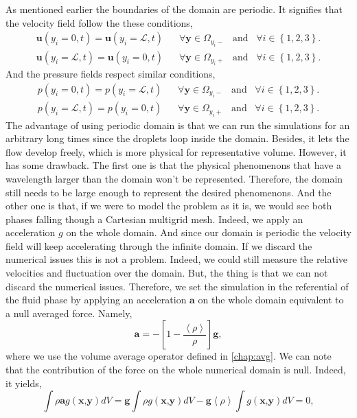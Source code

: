 As mentioned earlier  the boundaries of the domain are periodic. 
It signifies that the velocity field follow the these conditions,
\begin{align}
    \bm{u}(y_i = 0,t) = \bm{u}(y_i = \mathcal{L},t) \;\;\; &\forall \bm{y} \in \Omega_{y_i-} \;\;\;\text{and}\;\;\; \forall i \in \left\{1,2,3\right\}.\\
    \bm{u}(y_i = \mathcal{L},t) = \bm{u}(y_i = 0,t) \;\;\; & \forall \bm{y} \in \Omega_{y_i+} \;\;\;\text{and}\;\;\; \forall i \in \left\{1,2,3\right\}.
\end{align}
And the pressure fields respect similar conditions, 
\begin{align}
    p(y_i = 0,t) = p(y_i = \mathcal{L},t) \;\;\; &\forall \bm{y} \in \Omega_{y_i-} \;\;\;\text{and}\;\;\; \forall i \in \left\{1,2,3\right\}.\\
    p(y_i = \mathcal{L},t) = p(y_i = 0,t) \;\;\; & \forall \bm{y} \in \Omega_{y_i+} \;\;\;\text{and}\;\;\; \forall i \in \left\{1,2,3\right\}.
\end{align}
The advantage of using periodic domain is that we can run the simulations for an arbitrary long times since the droplets loop inside the domain.
Besides, it lets the flow develop freely, which is more physical for representative volume. 
However, it has some drawback.
The first  one is that the physical phenomenons that have a wavelength larger than the domain won't be represented. 
Therefore, the domain still needs to be large enough to represent the desired phenomenons.
And the other one is that, if we were to model the problem as it is, we would see both phases falling though a Cartesian multigrid mesh. 
Indeed, we apply an acceleration $g$ on the whole domain. 
And since our domain is periodic the velocity field will keep accelerating through the infinite domain.
If we discard the numerical issues this is not a problem.
Indeed, we could still measure the relative velocities and fluctuation over the domain. 
But, the thing is that we can not discard the numerical issues. 
Therefore, we set the simulation in the referential of the fluid phase by applying an acceleration $\bm{a}$ on the whole domain equivalent to a null averaged force.
Namely, 
\begin{equation}
    \textbf{a} = - \left[1-\frac{\left<\rho\right>}{\rho}\right]\textbf{g},
\end{equation}
where we use the volume average operator defined in \ref{chap:avg}.
We can note that the contribution of the force on the whole numerical domain is null.
Indeed, it yields, 
\begin{equation}
   \int \rho\textbf{a} g(\textbf{x,y}) dV 
    = \textbf{g}\int \rho g(\textbf{x,y}) dV -\textbf{g}\left<\rho\right>\int g(\textbf{x,y}) dV 
    =0,
\end{equation}
